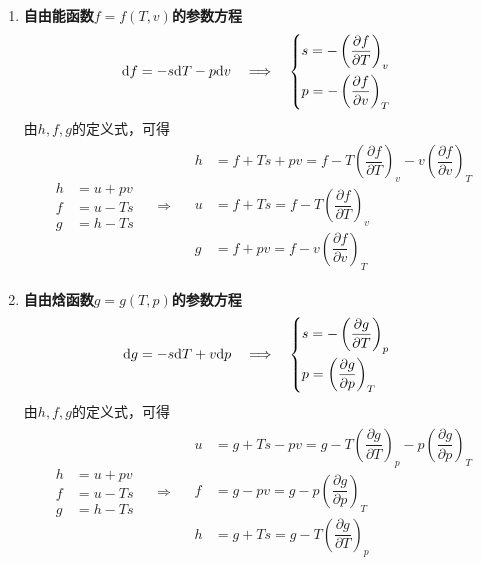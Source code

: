 \begin{enumerate}[1. ]
	\item \textbf{自由能函数$f = f(T, v)$的参数方程}
\begin{align*}
	{\rm{d}} f  = -s {\rm{d}} T - p {\rm{d}} v  \quad \Longrightarrow \quad 
	\begin{cases}
		s = -\left(\dfrac{\partial f}{\partial T}\right)_v \\[1em]
		p  = -\left(\dfrac{\partial f}{\partial v}\right)_T
	\end{cases}
\end{align*}
由$h,f,g$的定义式，可得
\begin{align*}
	\begin{aligned}
		h &= u +pv\\
		f &= u -Ts\\
		g &= h -Ts
	\end{aligned} 
	\quad \Longrightarrow \quad
	\begin{aligned}
		h &= f + Ts +pv= f - T\left(\dfrac{\partial f}{\partial T}\right)_v - v\left(\dfrac{\partial f}{\partial v}\right)_T\\[0.5em]
		u &= f + Ts = f - T\left(\dfrac{\partial f}{\partial T}\right)_v \\[0.5em]
		g &= f + pv = f - v\left(\dfrac{\partial f}{\partial v}\right)_T
	\end{aligned}
\end{align*}

	\item \textbf{自由焓函数$g = g(T, p)$的参数方程}
\begin{align*}
	{\rm{d}} g  = -s {\rm{d}} T + v {\rm{d}} p  \quad \Longrightarrow \quad 
	\begin{cases}
		s = -\left(\dfrac{\partial g}{\partial T}\right)_p \\[1em]
		p  = \left(\dfrac{\partial g}{\partial p}\right)_T
	\end{cases}
\end{align*}
由$h,f,g$的定义式，可得
\begin{align*}
	\begin{aligned}
		h &= u +pv\\
		f &= u -Ts\\
		g &= h -Ts
	\end{aligned} 
	\quad \Longrightarrow \quad
	\begin{aligned}
		u &= g + Ts - pv= g - T\left(\dfrac{\partial g}{\partial T}\right)_p - p\left(\dfrac{\partial g}{\partial p}\right)_T\\[0.5em]
		f &= g - pv = g - p\left(\dfrac{\partial g}{\partial p}\right)_T\\[0.5em]
		h &= g + Ts = g - T\left(\dfrac{\partial g}{\partial T}\right)_p
	\end{aligned}
\end{align*}
\end{enumerate}

